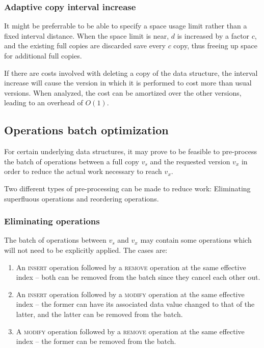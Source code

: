 
\subsubsection{Adaptive copy interval increase}
It might be preferrable to be able to specify a space usage limit rather than a
fixed interval distance. When the space limit is near, $d$ is increased by a
factor $c$, and the existing full copies are discarded save every $c$ copy, thus
freeing up space for additional full copies.


If there are costs involved with deleting a copy of the data structure, the
interval increase will cause the version in which it is performed to cost more
than usual versions. When analyzed, the cost can be amortized over the other
versions, leading to an overhead of $O(1)$.


\subsection{Operations batch optimization}
For certain underlying data structures, it may prove to be feasible to
pre-process the batch of operations between a full copy $v_s$ and the requested
version $v_x$ in order to reduce the actual work necessary to reach $v_x$.

Two different types of pre-processing can be made to reduce work: Eliminating
superfluous operations and reordering operations.

\subsubsection{Eliminating operations}
The batch of operations between $v_s$ and $v_x$ may contain some operations
which will not need to be explicitly applied. The cases are:
\begin{enumerate}
  \item An \textsc{insert} operation followed by a \textsc{remove} operation at
  the same effective index -- both can be removed from the batch since they
  cancel each other out.
  \label{item:elop-insert-remove}

  \item An \textsc{insert} operation followed by a \textsc{modify} operation at
  the same effective index -- the former can have its associated data value
  changed to that of the latter, and the latter can be removed from the batch.
  \label{item:elop-insert-modify}
  
  \item A \textsc{modify} operation followed by a \textsc{remove} operation at
  the same effective index -- the former can be removed from the batch.
  \label{item:elop-modify-remove}
\end{enumerate}

